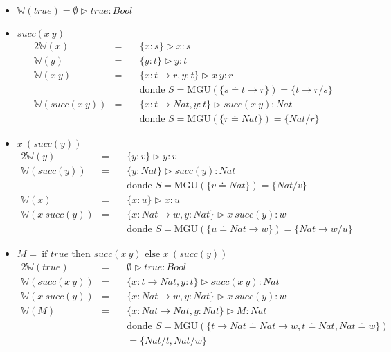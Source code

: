 \documentclass{report}
\theoremstyle{definition} %
\newcommand{\tfunc}[2]{#1 \to #2}
\newcommand{\ifte}[3]{\ \text{if } #1 \text{ then } #2 \text{ else } #3}
\newcommand{\app}[2]{#1 \ #2} %
\newcommand{\tipa}[3]{#1 \rhd #2 : #3} %
\newcommand{\suc}[1]{succ(#1)}
\newcommand{\sustfor}[2]{#1/#2} %
\newcommand{\infer}[1]{\mathbb{W}(#1)}
\newcommand{\etipa}[2]{\tipa{\emptyset}{#1}{#2}} %
\newcommand{\unify}[2]{#1 \doteq #2}
\newcommand{\mgu}[2]{\text{MGU}(\{ \unify{#1}{#2} \})}
\begin{document}
\begin{itemize}
    \item $\infer{true} = \etipa{true}{Bool}$
    \item $\suc{\app{x}{y}}$
    \begin{alignat*}{2}
        \infer{x} &=\ &&\tipa{\{x:s\}}{x}{s}\\
        \infer{y} &=\ &&\tipa{\{y:t\}}{y}{t}\\
        \infer{\app{x}{y}} &=\
        &&\tipa
            {\{ x: \tfunc{t}{r}, y: t\}}
            {\app{x}{y}}
            {r}\\
        & &&\text{donde } S = \mgu{s}{\tfunc{t}{r}} = \{ \tfunc{t}{r} / s
        \}\\
        \infer{\suc{\app{x}{y}}} &=\
        &&\tipa
            {\{ x: \tfunc{t}{Nat}, y: t \}}
            { \suc{\app{x}{y}} }
            {Nat}\\
        & &&\text{donde } S = \mgu{r}{Nat} = \{ \sustfor{Nat}{r} \}
    \end{alignat*}

    \item $\app{x}{(\suc{y})}$
    \begin{alignat*}{2}
        \infer{y} &=\ &&\tipa{\{y:v\}}{y}{v}\\
        \infer{\suc{y}} &=\
            &&\tipa{\{y: Nat\}}{\suc{y}}{Nat}\\
            & &&\text{donde } S = \mgu{v}{Nat} = \{ \sustfor{Nat}{v} \} \\
        \infer{x} &=\ &&\tipa{\{x:u\}}{x}{u}\\
        \infer{\app{x}{\suc{y}}} &=\
        &&\tipa
            {\{ x: \tfunc{Nat}{w}, y:Nat \}}
            {\app{x}{\suc{y}}}
            {w}\\
        & &&\text{donde } S = \mgu{u}{\tfunc{Nat}{w}} = \{
        \sustfor{\tfunc{Nat}{w}}{u} \}
    \end{alignat*}
    \item $M = \ifte{true}{\suc{\app{x}{y}}}{\app{x}{(\suc{y})}}$
    \begin{alignat*}{2}
        \infer{true} &=\
            &&\etipa{true}{Bool}\\
        \infer{\suc{\app{x}{y}}} &=\
            &&\tipa
            {\{ x: \tfunc{t}{Nat}, y: t \}}
            { \suc{\app{x}{y}} }
            {Nat}\\
        \infer{\app{x}{\suc{y}}} &=\
            &&\tipa
            {\{ x: \tfunc{Nat}{w}, y:Nat \}}
            {\app{x}{\suc{y}}}
            {w}\\
        \infer{M} &=\
            &&\tipa
                {\{ x: \tfunc{Nat}{Nat}, y: Nat\}}
                {M}
                {Nat}\\
        & && \text{donde }
        S = \text{MGU}(\{
            \unify{\tfunc{t}{Nat}}{\tfunc{Nat}{w}},
            \unify{t}{Nat},
            \unify{Nat}{w}
        \})\\
        & &&= \{ \sustfor{Nat}{t}, \sustfor{Nat}{w} \}
    \end{alignat*}


\end{itemize}
\end{document}

